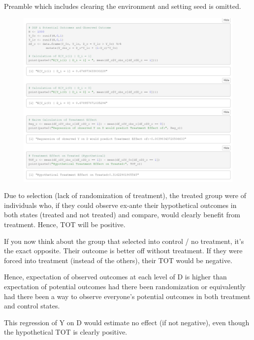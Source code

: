 \documentclass[12pt]{article}
\begin{document}
Preamble which includes clearing the environment and setting seed is omitted.

\begin{figure}[htp]
    \centering
    \includegraphics[width=15cm]{Q3c}
\end{figure}

Due to selection (lack of randomization of treatment), the treated group were of individuals who, if they could observe ex-ante their hypothetical outcomes in both states (treated and not treated) and compare, would clearly benefit from treatment. Hence, TOT will be positive.

If you now think about the group that selected into control / no treatment, it's the exact opposite. Their outcome is better off without treatment. If they were forced into treatment (instead of the others), their TOT would be negative.

Hence, expectation of observed outcomes at each level of D is higher than expectation of potential outcomes had there been randomization or equivalently had there been a way to observe everyone's potential outcomes in both treatment and control states.

This regression of Y on D would estimate no effect (if not negative), even though the hypothetical TOT is clearly positive.

\vem
{}
\end{document}
